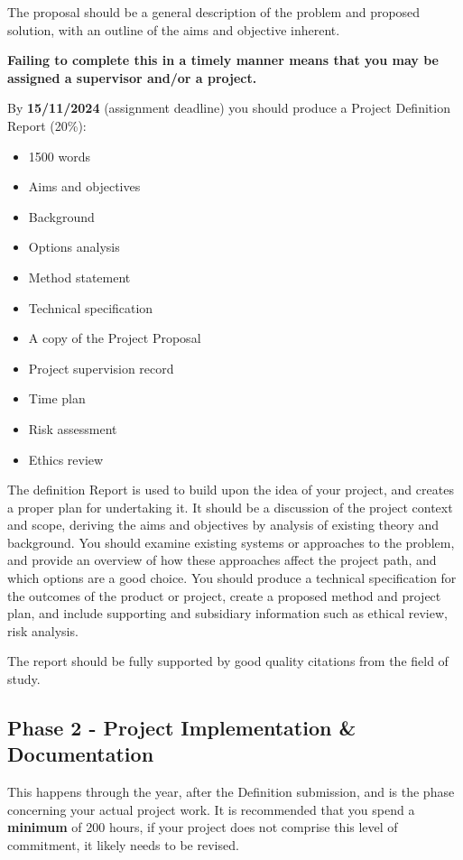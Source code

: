 The proposal should be a general description of the problem and proposed solution, with an outline of the aims and objective inherent. 

\medskip

\textbf{Failing to complete this in a timely manner means that you may be assigned a supervisor and/or a project.}

\medskip

By \textbf{15/11/2024} (assignment deadline) you should produce a Project Definition Report (20\%):

\begin{itemize}
    \item 1500 words
    \item Aims and objectives
    \item Background
    \item Options analysis
    \item Method statement
    \item Technical specification
    \item A copy of the Project Proposal
    \item Project supervision record
    \item Time plan
    \item Risk assessment
    \item Ethics review
\end{itemize}

The definition Report is used to build upon the idea of your project, and creates a proper plan for undertaking it. It should be a discussion of the project context and scope, deriving the aims and objectives by analysis of existing theory and background. You should examine existing systems or approaches to the problem, and provide an overview of how these approaches affect the project path, and which options are a good choice. You should produce a technical specification for the outcomes of the product or project, create a proposed method and project plan, and include supporting and subsidiary information such as ethical review, risk analysis. 

The report should be fully supported by good quality citations from the field of study.

\subsection{Phase 2 - Project Implementation \& Documentation}

This happens through the year, after the Definition submission, and is the phase concerning your actual project work. It is recommended that you spend a \textbf{minimum} of 200 hours, if your project does not comprise this level of commitment, it likely needs to be revised.

